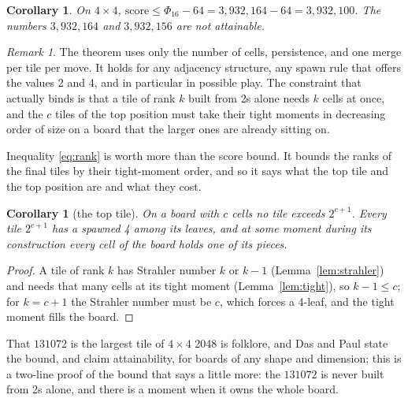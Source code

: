 \documentclass[11pt]{article}
\newtheorem{corollary}[theorem]{Corollary}
\theoremstyle{definition}
\theoremstyle{remark}
\newtheorem{remark}[theorem]{Remark}
\begin{document}
\begin{corollary}\label{cor:4x4}
On $4\times4$, $\mathrm{score}\le\Phi_{16}-64=3{,}932{,}164-64=3{,}932{,}100$.
The numbers $3{,}932{,}164$ and $3{,}932{,}156$ are not attainable.
\end{corollary}

\begin{remark}
The theorem uses only the number of cells, persistence, and one merge per
tile per move. It holds for any adjacency structure, any spawn rule that
offers the values 2 and 4, and in particular in possible play. The
constraint that actually binds is that a tile of rank $k$ built from 2s
alone needs $k$ cells at once, and the $c$ tiles of the top position must
take their tight moments in decreasing order of size on a board that the
larger ones are already sitting on.
\end{remark}

Inequality \eqref{eq:rank} is worth more than the score bound. It bounds
the ranks of the final tiles by their tight-moment order, and so it says
what the top tile and the top position are and what they cost.

\begin{corollary}[the top tile]\label{cor:toptile}
On a board with $c$ cells no tile exceeds $2^{c+1}$. Every tile
$2^{c+1}$ has a spawned 4 among its leaves, and at some moment during its
construction every cell of the board holds one of its pieces.
\end{corollary}
\begin{proof}
A tile of rank $k$ has Strahler number $k$ or $k-1$
(Lemma~\ref{lem:strahler}) and needs that many cells at its tight moment
(Lemma~\ref{lem:tight}), so $k-1\le c$; for $k=c+1$ the Strahler number
must be $c$, which forces a 4-leaf, and the tight moment fills the board.
\end{proof}

That $131072$ is the largest tile of $4\times4$ 2048 is folklore, and
Das and Paul \cite{daspaul2018} state the bound, and claim attainability,
for boards of any shape and dimension; this is a two-line proof of the
bound that says a little more: the $131072$ is never built from 2s alone,
and there is a moment when it owns the whole board.
\end{document}
